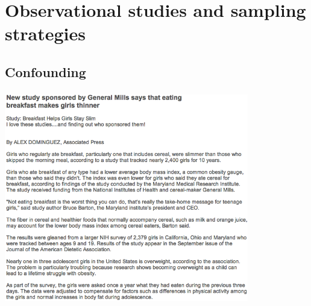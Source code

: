 
\section{Observational studies and sampling strategies}


\subsection{Confounding}


\begin{frame}
\frametitle{}

\begin{center}
\includegraphics[width=0.80\textwidth]{1-4_obs_studies_sampling/figures/breakfast/breakfast1}
\end{center}

{\tiny {}}

\end{frame}


